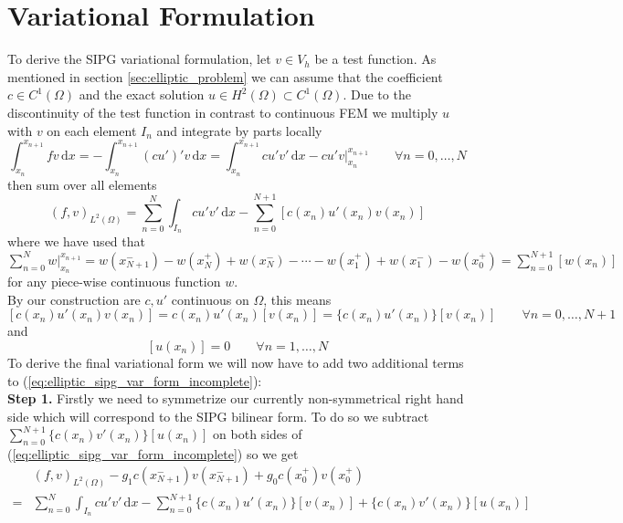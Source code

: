 \section{Variational Formulation}
To derive the SIPG variational formulation, let $v \in V_h$ be a test
function. As mentioned in section \ref{sec:elliptic_problem} we can assume that the coefficient $c \in C^1(\Omega)$ and
the exact solution $u \in H^2(\Omega) \subset C^1(\Omega)$.
Due to the discontinuity of the test function in contrast to
continuous FEM we multiply $u$ with $v$ on each element $I_n$
and integrate by parts locally
\begin{equation*}
	\int_{x_n}^{x_{n+1}} fv\, \text{d}x = -\int_{x_n}^{x_{n+1}} (cu')'v\, \text{d}x
	= \int_{x_n}^{x_{n+1}} cu'v'\, \text{d}x
	-  cu'v\Big|_{x_n}^{x_{n+1}} \qquad \forall n=0,\ldots,N
\end{equation*}
then sum over all elements
\begin{equation}
	\label{eq:elliptic_sipg_var_form_incomplete}
	(f,v)_{L^2(\Omega)} = \sum_{n=0}^N \int_{I_n} cu'v'\, \text{d}x
	-\sum_{n=0}^{N+1} [c(x_n)u'(x_n)v(x_n)]
\end{equation}
where we have used that $\sum_{n=0}^N  w \Big|_{x_n}^{x_{n+1}} = w(x_{N+1}^-) -
	w(x_{N}^+) + w(x_{N}^-) - \cdots - w(x_1^+) + w(x_1^-) - w(x_0^+) = \sum_{n=0}^{N+1} [w(x_n)]$ for any piece-wise continuous function $w$.
\\
By our construction are $c, u'$ continuous on $\Omega$, this means
\begin{equation}
	\label{eq:id_1_cu_jump_zero}
	[c(x_n)u'(x_n)v(x_n)] = c(x_n)u'(x_n)[v(x_n)] = \{c(x_n)u'(x_n)\}[v(x_n)] \qquad \forall n=0,\ldots,N+1
\end{equation}
and
\begin{equation}
	\label{eq:id_2_u_jump_zero}
	[u(x_n)] = 0 \qquad \forall n=1,\ldots,N
\end{equation}
To derive the final variational form we will now have to add two additional terms
to (\ref{eq:elliptic_sipg_var_form_incomplete}): \\
\textbf{Step 1.} Firstly we need to symmetrize our currently non-symmetrical right hand side
which will correspond to the SIPG bilinear form. To do so
we subtract $\sum_{n=0}^{N+1} \{c(x_n)v'(x_n)\}[u(x_n)]$ on both sides of
(\ref{eq:elliptic_sipg_var_form_incomplete}) so we get
\begin{align*}
	  & (f,v)_{L^2(\Omega)}-g_1c(x_{N+1}^-)v(x_{N+1}^-) + g_0c(x_0^+)v(x_0^+) \\
	= & \sum_{n=0}^N \int_{I_n} cu'v'\, \text{d}x
	-\sum_{n=0}^{N+1} \{c(x_n)u'(x_n)\}[v(x_n)] + \{c(x_n)v'(x_n)\}[u(x_n)]
\end{align*}
